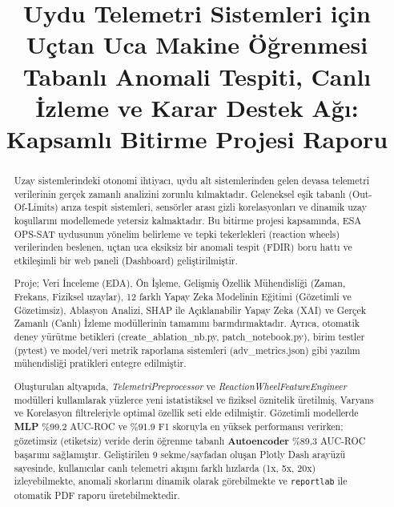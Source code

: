 \documentclass[conference,10pt]{IEEEtran}
\begin{document}
\title{Uydu Telemetri Sistemleri için Uçtan Uca Makine Öğrenmesi Tabanlı Anomali Tespiti, Canlı İzleme ve Karar Destek Ağı: Kapsamlı Bitirme Projesi Raporu\\}

\author{
}

\maketitle

\begin{abstract}
Uzay sistemlerindeki otonomi ihtiyacı, uydu alt sistemlerinden gelen devasa telemetri verilerinin gerçek zamanlı analizini zorunlu kılmaktadır. Geleneksel eşik tabanlı (Out-Of-Limits) arıza tespit sistemleri, sensörler arası gizli korelasyonları ve dinamik uzay koşullarını modellemede yetersiz kalmaktadır. Bu bitirme projesi kapsamında, ESA OPS-SAT uydusunun yönelim belirleme ve tepki tekerlekleri (reaction wheels) verilerinden beslenen, uçtan uca eksiksiz bir anomali tespit (FDIR) boru hattı ve etkileşimli bir web paneli (Dashboard) geliştirilmiştir. 

Proje; Veri İnceleme (EDA), Ön İşleme, Gelişmiş Özellik Mühendisliği (Zaman, Frekans, Fiziksel uzaylar), 12 farklı Yapay Zeka Modelinin Eğitimi (Gözetimli ve Gözetimsiz), Ablasyon Analizi, SHAP ile Açıklanabilir Yapay Zeka (XAI) ve Gerçek Zamanlı (Canlı) İzleme modüllerinin tamamını barındırmaktadır. Ayrıca, otomatik deney yürütme betikleri (create\_ablation\_nb.py, patch\_notebook.py), birim testler (pytest) ve model/veri metrik raporlama sistemleri (adv\_metrics.json) gibi yazılım mühendisliği pratikleri entegre edilmiştir.

Oluşturulan altyapıda, \textit{TelemetriPreprocessor} ve \textit{ReactionWheelFeatureEngineer} modülleri kullanılarak yüzlerce yeni istatistiksel ve fiziksel öznitelik üretilmiş, Varyans ve Korelasyon filtreleriyle optimal özellik seti elde edilmiştir. Gözetimli modellerde \textbf{MLP} \%99.2 AUC-ROC ve \%91.9 F1 skoruyla en yüksek performansı verirken; gözetimsiz (etiketsiz) veride derin öğrenme tabanlı \textbf{Autoencoder} \%89.3 AUC-ROC başarımı sağlamıştır. Geliştirilen 9 sekme/sayfadan oluşan Plotly Dash arayüzü sayesinde, kullanıcılar canlı telemetri akışını farklı hızlarda (1x, 5x, 20x) izleyebilmekte, anomali skorlarını dinamik olarak görebilmekte ve \texttt{reportlab} ile otomatik PDF raporu üretebilmektedir.
\end{abstract}
\end{document}
